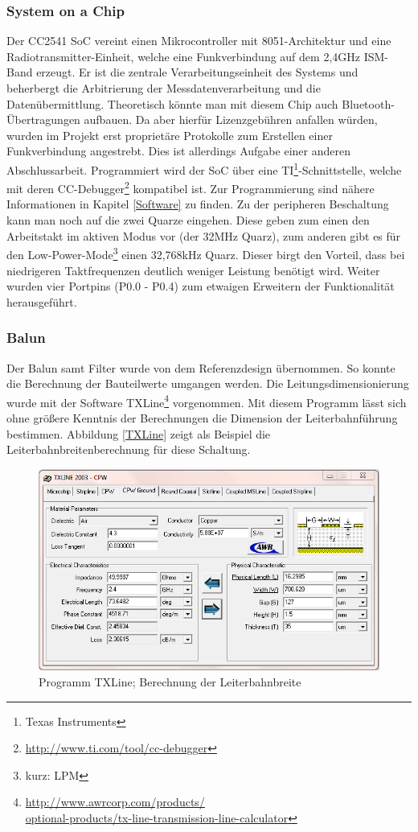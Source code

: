\documentclass[12pt]{scrreprt} %
\begin{document}
\subsubsection{System on a Chip}
Der CC2541 SoC vereint einen Mikrocontroller mit 8051-Architektur und eine Radiotransmitter-Einheit, welche eine Funkverbindung auf dem 2,4GHz ISM-Band erzeugt. Er ist die zentrale Verarbeitungseinheit des Systems und beherbergt die Arbitrierung der Messdatenverarbeitung und die Datenübermittlung.  Theoretisch könnte man mit diesem Chip auch Bluetooth-Übertragungen aufbauen. Da aber hierfür Lizenzgebühren anfallen würden, wurden im Projekt erst proprietäre Protokolle zum Erstellen einer Funkverbindung angestrebt. Dies ist allerdings Aufgabe einer anderen Abschlussarbeit. Programmiert wird der SoC über eine TI\footnote{Texas Instruments}-Schnittstelle, welche mit deren CC-Debugger\footnote{\url{http://www.ti.com/tool/cc-debugger}} kompatibel ist. Zur Programmierung sind nähere Informationen in Kapitel \vref{Software} zu finden. Zu der peripheren Beschaltung kann man noch auf die zwei Quarze eingehen. Diese geben zum einen den Arbeitstakt im aktiven Modus vor (der 32MHz Quarz), zum anderen gibt es für den Low-Power-Mode\footnote{kurz: LPM} einen 32,768kHz Quarz. Dieser birgt den Vorteil, dass bei niedrigeren Taktfrequenzen deutlich weniger Leistung benötigt wird. Weiter wurden vier Portpins (P0.0 - P0.4) zum etwaigen Erweitern der Funktionalität herausgeführt. 
\subsubsection{Balun}
Der Balun samt Filter wurde von dem Referenzdesign übernommen. So konnte die Berechnung der Bauteilwerte umgangen werden. Die Leitungsdimensionierung wurde mit der Software TXLine\footnote{\url{http://www.awrcorp.com/products/}\\\url{optional-products/tx-line-transmission-line-calculator}} vorgenommen. Mit diesem Programm lässt sich ohne größere Kenntnis der Berechnungen die Dimension der Leiterbahnführung bestimmen. Abbildung \vref{TXLine} zeigt als Beispiel die Leiterbahnbreitenberechnung für diese Schaltung.
\begin{figure}
\centering
\includegraphics[width=1\textwidth]{Bilder/TXLine.png}
\caption{Programm TXLine; Berechnung der Leiterbahnbreite}
\label{TXLine}
\end{figure}
\end{document}

